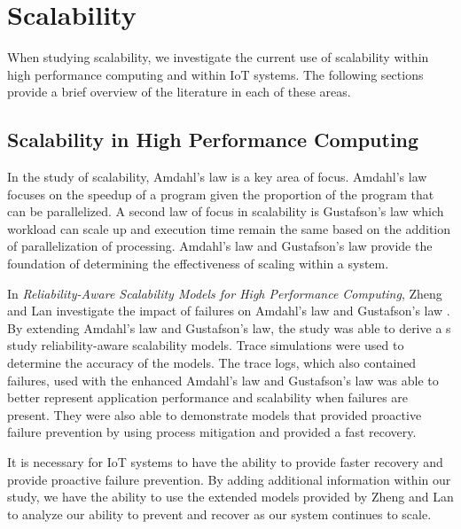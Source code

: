 \documentclass[../main.tex]{subfiles}
\begin{document}
\section{Scalability}

When studying scalability, we investigate the current use of scalability within high performance computing and within IoT systems. The following sections provide a brief overview of the literature in each of these areas.

\subsection{Scalability in High Performance Computing}

In the study of scalability, Amdahl's law is a key area of focus. Amdahl's law focuses on the speedup of a program given the proportion of the program that can be parallelized\cite{dr-dobbs, 5289177}. A second law of focus in scalability is Gustafson's law which workload can scale up and execution time remain the same based on the addition of parallelization of processing\cite{dr-dobbs, umn, 5289177}. Amdahl's law and Gustafson's law provide the foundation of determining the effectiveness of scaling within a system.


In \textit{Reliability-Aware Scalability Models for High Performance Computing}, Zheng and Lan investigate the impact of failures on Amdahl's law and Gustafson’s law \cite{5289177}. By extending Amdahl’s law and Gustafson’s law, the study was able to derive a s study reliability-aware scalability models. Trace simulations were used to determine the accuracy of the models. The trace logs, which also contained failures, used with the enhanced Amdahl's law and Gustafson's law was able to better represent application performance and scalability when failures are present. They were also able to demonstrate models that provided proactive failure prevention by using process mitigation and provided a fast recovery. 

It is necessary for IoT systems to have the ability to provide faster recovery and provide proactive failure prevention. By adding additional information within our study, we have the ability to use the extended models provided by Zheng and Lan to analyze our ability to prevent and recover as our system continues to scale.
\end{document}
